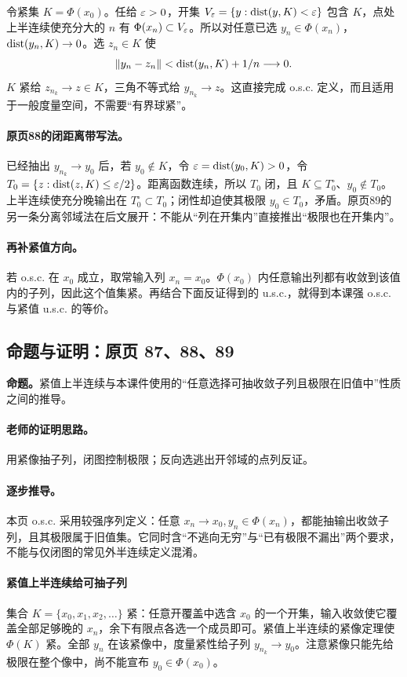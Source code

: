 令紧集 $K=\Phi(x_0)$。任给 $\varepsilon>0$，开集 $V_\varepsilon=\{y:\operatorname{dist}(y,K)<\varepsilon\}$ 包含 $K$，点处上半连续使充分大的 $n$ 有 $\Phi(x_n)\subset V_\varepsilon$。所以对任意已选 $y_n\in\Phi(x_n)$，$\operatorname{dist}(y_n,K)\to0$。选 $z_n\in K$ 使
\[\|y_n-z_n\|<\operatorname{dist}(y_n,K)+1/n\longrightarrow0.\]
$K$ 紧给 $z_{n_k}\to z\in K$，三角不等式给 $y_{n_k}\to z$。这直接完成 o.s.c. 定义，而且适用于一般度量空间，不需要“有界球紧”。

\paragraph{原页88的闭距离带写法。}
已经抽出 $y_{n_k}\to y_0$ 后，若 $y_0\notin K$，令 $\varepsilon=\operatorname{dist}(y_0,K)>0$，令 $T_0=\{z:\operatorname{dist}(z,K)\le\varepsilon/2\}$。距离函数连续，所以 $T_0$ 闭，且 $K\subseteq T_0^\circ$、$y_0\notin T_0$。上半连续使充分晚输出在 $T_0^\circ\subset T_0$；闭性却迫使其极限 $y_0\in T_0$，矛盾。原页89的另一条分离邻域法在后文展开：不能从“列在开集内”直接推出“极限也在开集内”。

\paragraph{再补紧值方向。}
若 o.s.c. 在 $x_0$ 成立，取常输入列 $x_n=x_0$。$\Phi(x_0)$ 内任意输出列都有收敛到该值内的子列，因此这个值集紧。再结合下面反证得到的 u.s.c.，就得到本课强 o.s.c. 与紧值 u.s.c. 的等价。


\subsection{命题与证明：原页 87、88、89}

\textbf{命题。}紧值上半连续与本课件使用的“任意选择可抽收敛子列且极限在旧值中”性质之间的推导。

\paragraph{老师的证明思路。}用紧像抽子列，闭图控制极限；反向选逃出开邻域的点列反证。

\paragraph{逐步推导。}
本页 o.s.c. 采用较强序列定义：任意 $x_n\to x_0,y_n\in\Phi(x_n)$，都能抽输出收敛子列，且其极限属于旧值集。它同时含“不逃向无穷”与“已有极限不漏出”两个要求，不能与仅闭图的常见外半连续定义混淆。
\paragraph{紧值上半连续给可抽子列}
集合 $K=\{x_0,x_1,x_2,\ldots\}$ 紧：任意开覆盖中选含 $x_0$ 的一个开集，输入收敛使它覆盖全部足够晚的 $x_n$，余下有限点各选一个成员即可。紧值上半连续的紧像定理使 $\Phi(K)$ 紧。全部 $y_n$ 在该紧像中，度量紧性给子列 $y_{n_k}\to y_0$。注意紧像只能先给极限在整个像中，尚不能宣布 $y_0\in\Phi(x_0)$。
